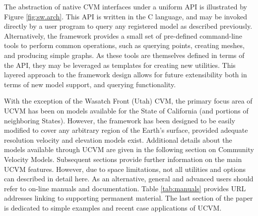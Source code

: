 The abstraction of native CVM interfaces under a uniform API is illustrated by Figure \ref{fig:sw.arch}. This API is written in the C language, and may be invoked directly by a user program to query any registered model as described previously. Alternatively, the framework provides a small set of pre-defined command-line tools to perform common operations, such as querying points, creating meshes, and producing simple graphs. As these tools are themselves defined in terms of the API, they may be leveraged as templates for creating new utilities. This layered approach to the framework design allows for future extensibility both in terms of new model support, and querying functionality.

With the exception of the Wasatch Front (Utah) CVM, the primary focus area of UCVM has been on models available for the State of California (and portions of neighboring States). However, the framework has been designed to be easily modified to cover any arbitrary region of the Earth's surface, provided adequate resolution velocity and elevation models exist. Additional details about the models available through UCVM are given in the following section on Community Velocity Models. Subsequent sections provide further information on the main UCVM features. However, due to space limitations, not all utilities and options can described in detail here. As an alternative, general and advanced users should refer to on-line manuals and documentation. Table \ref{tab:manuals} provides URL addresses linking to supporting permanent material. The last section of the paper is dedicated to simple examples and recent case applications of UCVM. 

